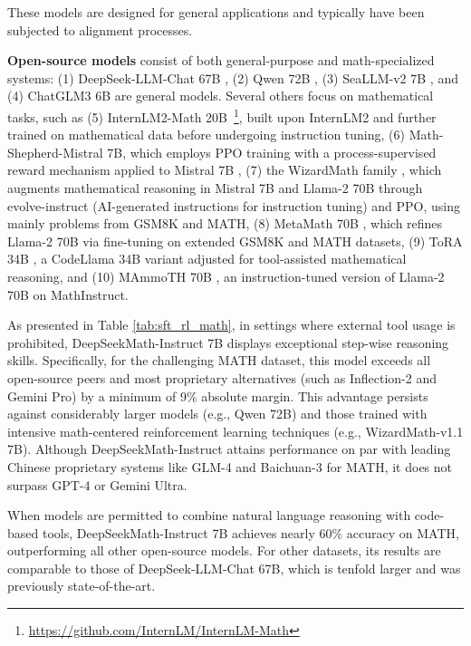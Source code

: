 These models are designed for general applications and typically have been subjected to alignment processes.

\item \textbf{Open-source models} consist of both general-purpose and math-specialized systems: (1) DeepSeek-LLM-Chat 67B \citep{deepseek-llm}, (2) Qwen 72B \citep{qwen}, (3) SeaLLM-v2 7B \citep{seallm}, and (4) ChatGLM3 6B \citep{chatglm3} are general models. Several others focus on mathematical tasks, such as (5) InternLM2-Math 20B~\footnote{\url{https://github.com/InternLM/InternLM-Math}}, built upon InternLM2 and further trained on mathematical data before undergoing instruction tuning, (6) Math-Shepherd-Mistral 7B, which employs PPO training \citep{schulman2017proximal} with a process-supervised reward mechanism applied to Mistral 7B \citep{mistral}, (7) the WizardMath family \citep{wizardmath}, which augments mathematical reasoning in Mistral 7B and Llama-2 70B \citep{llama2} through evolve-instruct (AI-generated instructions for instruction tuning) and PPO, using mainly problems from GSM8K and MATH, (8) MetaMath 70B \citep{metamath}, which refines Llama-2 70B via fine-tuning on extended GSM8K and MATH datasets, (9) ToRA 34B \cite{tora}, a CodeLlama 34B variant adjusted for tool-assisted mathematical reasoning, and (10) MAmmoTH 70B \citep{MathInstruct}, an instruction-tuned version of Llama-2 70B on MathInstruct.

As presented in Table \ref{tab:sft_rl_math}, in settings where external tool usage is prohibited, DeepSeekMath-Instruct 7B displays exceptional step-wise reasoning skills. Specifically, for the challenging MATH dataset, this model exceeds all open-source peers and most proprietary alternatives (such as Inflection-2 and Gemini Pro) by a minimum of 9\% absolute margin. This advantage persists against considerably larger models (e.g., Qwen 72B) and those trained with intensive math-centered reinforcement learning techniques (e.g., WizardMath-v1.1 7B). Although DeepSeekMath-Instruct attains performance on par with leading Chinese proprietary systems like GLM-4 and Baichuan-3 for MATH, it does not surpass GPT-4 or Gemini Ultra.

When models are permitted to combine natural language reasoning with code-based tools, DeepSeekMath-Instruct 7B achieves nearly 60\% accuracy on MATH, outperforming all other open-source models. For other datasets, its results are comparable to those of DeepSeek-LLM-Chat 67B, which is tenfold larger and was previously state-of-the-art.

